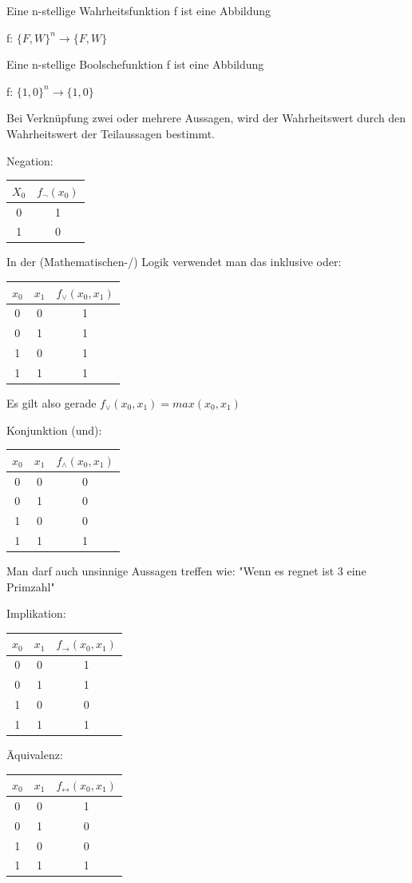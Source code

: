 \documentclass[12pt,a4paper]{article} %
\begin{document}
Eine n-stellige Wahrheitsfunktion f ist eine Abbildung

f: $\{F, W\}^n \rightarrow \{F, W\}$

Eine n-stellige Boolschefunktion f ist eine Abbildung

f: $\{1, 0\}^n \rightarrow \{1, 0\}$

Bei Verknüpfung zwei oder mehrere Aussagen, wird der Wahrheitswert durch den Wahrheitswert der Teilaussagen bestimmt.

Negation:\newline
\begin{tabular}{c | c}
	$X_0$ & $f_{\neg}(x_0)$ \\ \hline
	0 & 1 \\
	1 & 0
\end{tabular}

In der (Mathematischen-/) Logik verwendet man das inklusive oder: \newline
\begin{tabular}{c | c | c}
	$x_0$ & $x_1$ & $f_{\vee}(x_0, x_1)$ \\ \hline
	0 & 0 & 1 \\
	0 & 1 & 1 \\
	1 & 0 & 1 \\
	1 & 1 & 1
\end{tabular}

Es gilt also gerade $f_{\vee}(x_0, x_1) = max(x_0, x_1)$

Konjunktion (und):\newline
\begin{tabular}{c | c | c}
	$x_0$ & $x_1$ & $f_{\wedge}(x_0, x_1)$ \\ \hline
	0 & 0 & 0 \\
	0 & 1 & 0 \\
	1 & 0 & 0 \\
	1 & 1 & 1
\end{tabular}

Man darf auch unsinnige Aussagen treffen wie: "Wenn es regnet ist 3 eine Primzahl"

Implikation:\newline
\begin{tabular}{c | c | c}
	$x_0$ & $x_1$ & $f_{\rightarrow}(x_0, x_1)$ \\ \hline
	0 & 0 & 1 \\
	0 & 1 & 1 \\
	1 & 0 & 0 \\
	1 & 1 & 1
\end{tabular}

Äquivalenz:\newline
\begin{tabular}{c | c | c}
	$x_0$ & $x_1$ & $f_{\leftrightarrow}(x_0, x_1)$ \\ \hline
	0 & 0 & 1 \\
	0 & 1 & 0 \\
	1 & 0 & 0 \\
	1 & 1 & 1
\end{tabular}
\end{document}
